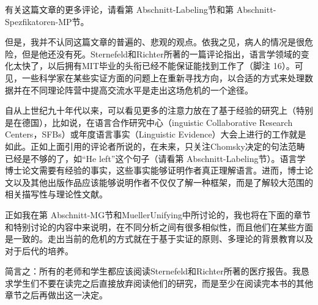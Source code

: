   有关这篇文章的更多评论，请看第 Abschnitt-Labeling节和第 Abschnitt-Spezfikatoren-MP节。




















但是，我并不认同这篇文章的普遍的、悲观的观点。依我之见，病人的情况是很危险，但是他还没有死。Sternefeld和Richter所著的一篇评论指出，语言学领域的变化太快了，以后拥有MIT毕业的头衔已经不能保证能找到工作了（脚注 16）。可见，一些科学家在某些实证方面的问题上在重新寻找方向，以合适的方式来处理数据并在不同理论阵营中提高交流水平是走出这场危机的一个途径。






自从上世纪九十年代以来，可以看见更多的注意力放在了基于经验的研究上（特别是在德国），比如说，在语言合作研究中心（inguistic Collaborative Research Centers，SFBs）或年度语言事实（Linguistic Evidence）大会上进行的工作就是如此。正如上面引用的评论者所说的，在未来，只关注Chomsky决定的句法范畴已经是不够的了，如“He left”这个句子（请看第 Abschnitt-Labeling节）。语言学博士论文需要有经验的事实，这些事实能够证明作者真正理解语言。进而，博士论文以及其他出版作品应该能够说明作者不仅仅了解一种框架，而是了解较大范围的相关描写性与理论性文献。









正如我在第 Abschnitt-MG节和MuellerUnifying中所讨论的，我也将在下面的章节和特别讨论的内容中来说明，在不同分析之间有很多相似性，而且他们在某些方面是一致的。走出当前的危机的方式就在于基于实证的原则、多理论的背景教育以及对于后代的培养。





简言之：所有的老师和学生都应该阅读Sternefeld和Richter所著的医疗报告。我恳求学生们不要在读完之后直接放弃阅读他们的研究，而是至少在阅读完本书的其他章节之后再做出这一决定。






